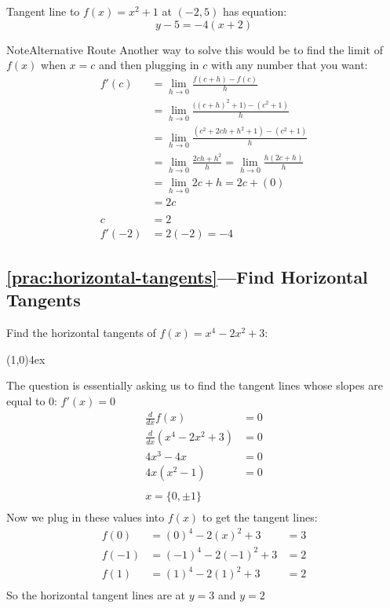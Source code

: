 \documentclass{MathNotes}
\newenvironment{note}[1]{\begin{YellowBox}{Note}{#1}}{\end{YellowBox}}
\newcommand{\br}{
	\begin{center}
		\line(1,0){4ex}
	\end{center}}
\begin{document}
Tangent line to $f(x)=x^2+1$ at $(-2, 5)$ has equation: $$y-5=-4(x+2)$$
\begin{note}{Alternative Route}
	Another way to solve this would be to find the limit of $f(x)$ when $x=c$
	and then plugging in $c$ with any number that you want:
	\begin{align*}
		f'(c)  & =\lim_{h\to 0}\frac{f(c+h)-f(c)}{h}                              \\
		       & =\lim_{h\to 0}\frac{\bigl((c+h)^2+1\bigr)-(c^2+1)}{h}            \\
		       & =\lim_{h\to 0}\frac{(c^2+2ch+h^2+1)-(c^2+1)}{h}                  \\
		       & =\lim_{h\to 0}\frac{2ch+h^2}{h} = \lim_{h\to 0}\frac{h(2c+h)}{h} \\
		       & =\lim_{h\to 0} 2c+h=2c+(0)                                       \\
		       & =2c                                                              \\
		\\
		c      & =2                                                               \\
		f'(-2) & =2(-2)=-4
	\end{align*}
\end{note}

\newpage
\subsection*{\ref{prac:horizontal-tangents}---Find Horizontal Tangents}\label{ans:horizontal-tangents}
Find the horizontal tangents of $f(x)=x^4-2x^2+3$:
\br
The question is essentially asking us to find the tangent lines whose
slopes are equal to 0: $f'(x)=0$
\begin{align*}
	\frac{d}{dx}f(x)         & =0 \\
	\frac{d}{dx}(x^4-2x^2+3) & =0 \\
	4x^3-4x                  & =0 \\
	4x(x^2-1)                & =0 \\
	\\
	x=\{0, \pm 1\}                \\
\end{align*}
Now we plug in these values into $f(x)$ to get the tangent lines:
\begin{align*}
	f(0)  & =(0)^4-2(x)^2+3   & =3 \\
	f(-1) & =(-1)^4-2(-1)^2+3 & =2 \\
	f(1)  & =(1)^4-2(1)^2+3   & =2 \\
\end{align*}
So the horizontal tangent lines are at $y=3$ and $y=2$
\end{document}
